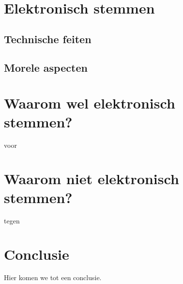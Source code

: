 \documentclass[a4paper]{article}
\begin{document}
\section{Elektronisch stemmen}

\subsection{Technische feiten}

\subsection{Morele aspecten}


\section{Waarom wel elektronisch stemmen?}

voor

\section{Waarom niet elektronisch stemmen?}

tegen


\section{Conclusie}

Hier komen we tot een conclusie.

\newpage


\renewcommand\refname{Literatuur}

\end{document}
